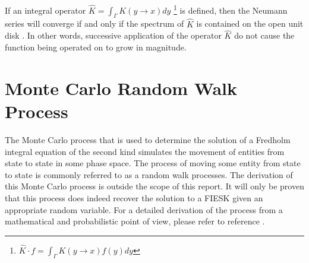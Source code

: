 If an integral operator $\hat{K} = \int_{\Gamma} K(y \to x)dy$
\footnote{$\hat{K} \cdot f = \int_{\Gamma} K(y \to x)f(y)dy$} is defined, then 
the Neumann series will converge if and only if the spectrum of $\hat{K}$ is 
contained on the open unit disk \citep{rahman_integral_2007,morse_methods_1953,spanier_monte_1969}. In other words, successive application of the operator
$\hat{K}$ do not cause the function being operated on to grow in magnitude.

\section{Monte Carlo Random Walk Process}
\label{sec:mc_random_walk_process}
The Monte Carlo process that is used to determine the solution of a Fredholm
integral equation of the second kind simulates the movement of entities from
state to state in some phase space. The process of moving some entity from
state to state is commonly referred to as a random walk processes. The 
derivation of this Monte Carlo process is outside the scope of this report. It 
will only be proven that this process does indeed recover the solution to a 
FIESK given an appropriate random variable. For a detailed derivation of the 
process from a mathematical and probabilistic point of view, please refer to 
reference \cite{spanier_monte_1969}. 

